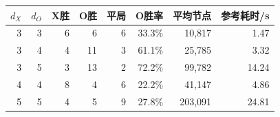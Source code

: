 \begin{tabular}{rrrrrrrr}
\toprule
$d_X$ & $d_O$ & X胜 & O胜 & 平局 & O胜率 & 平均节点 & 参考耗时/s \\
\midrule
3 & 3 & 6 & 6 & 6 & 33.3\% & 10,817 & 1.47 \\
3 & 4 & 4 & 11 & 3 & 61.1\% & 25,785 & 3.32 \\
3 & 5 & 3 & 13 & 2 & 72.2\% & 99,782 & 14.24 \\
4 & 4 & 8 & 4 & 6 & 22.2\% & 41,147 & 4.86 \\
5 & 5 & 4 & 5 & 9 & 27.8\% & 203,091 & 24.81 \\
\bottomrule
\end{tabular}
